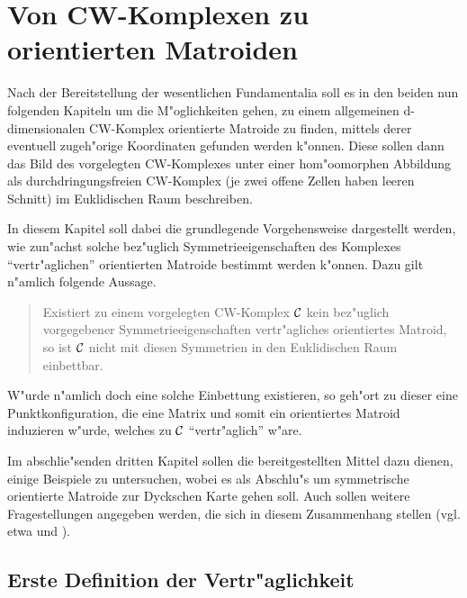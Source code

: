 \chapter{Von CW-Komplexen zu orientierten Matroiden}

Nach der Bereitstellung der wesentlichen Fundamentalia soll es in den beiden
nun folgenden Kapiteln um die M"oglichkeiten gehen, zu einem allgemeinen
d-dimensionalen CW-Komplex orientierte Matroide zu finden, mittels derer
eventuell zugeh"orige Koordinaten gefunden werden k"onnen. Diese sollen dann
das Bild des vorgelegten CW-Komplexes unter einer ho\-m"oo\-mor\-phen
Abbildung als durchdringungsfreien CW-Komplex (je zwei offene Zellen haben
leeren Schnitt) im Euklidischen Raum beschreiben.

In diesem Kapitel soll dabei die grundlegende Vorgehensweise dargestellt
werden, wie zun"achst solche bez"uglich Symmetrieeigenschaften des Komplexes
"`vertr"aglichen"' orientierten Matroide bestimmt werden k"onnen. Dazu gilt
n"amlich folgende Aussage.
\begin{quote}
{\sf
Existiert zu einem vorgelegten CW-Komplex ${\cal C}$ kein bez"uglich vorgegebener
Symmetrieeigenschaften vertr"agliches orientiertes Matroid, so ist ${\cal C}$ nicht
mit diesen Symmetrien in den Euklidischen Raum einbettbar.
}
\end{quote}
W"urde n"amlich doch eine solche Einbettung existieren, so geh"ort zu dieser
eine Punktkonfiguration, die eine Matrix und somit ein orientiertes Matroid
induzieren w"urde, welches zu ${\cal C}$ "`vertr"aglich"' w"are.

Im abschlie"senden dritten Kapitel sollen die bereitgestellten Mittel dazu
dienen, einige Beispiele zu untersuchen, wobei es als Abschlu"s um symmetrische
orientierte Matroide zur Dyckschen Karte gehen soll. Auch sollen weitere
Fragestellungen angegeben werden, die sich in diesem Zusammenhang stellen
(vgl. etwa \cite{Bo:86} und \cite{Bo:91}).

\section{Erste Definition der Vertr"aglichkeit}

